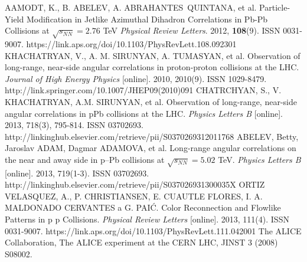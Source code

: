 \documentclass[thesismargins, thesislinespacing]{rnthesis}
\begin{document}
\begin{thebibliography}{}
AAMODT, K., B. ABELEV, A. ABRAHANTES QUINTANA, et al. Particle-Yield Modification in Jetlike Azimuthal Dihadron Correlations in Pb-Pb Collisions at $\sqrt{s_{NN}} = 2.76$ TeV \textit{Physical Review Letters}. 2012, \textbf{108}(9). ISSN 0031-9007. https://link.aps.org/doi/10.1103/PhysRevLett.108.092301
KHACHATRYAN, V., A. M. SIRUNYAN, A. TUMASYAN, et al. Observation of long-range, near-side angular correlations in proton-proton collisions at the LHC. \textit{Journal of High Energy Physics} [online]. 2010, 2010(9). ISSN 1029-8479. http://link.springer.com/10.1007/JHEP09(2010)091
CHATRCHYAN, S., V. KHACHATRYAN, A.M. SIRUNYAN, et al. Observation of long-range, near-side angular correlations in pPb collisions at the LHC. \textit{Physics Letters B} [online]. 2013, 718(3), 795-814. ISSN 03702693. http://linkinghub.elsevier.com/retrieve/pii/S0370269312011768
ABELEV, Betty, Jaroslav ADAM, Dagmar ADAMOVA, et al. Long-range angular correlations on the near and away side in p–Pb collisions at $\sqrt{s_{NN}}=5.02$ TeV. \textit{Physics Letters B} [online]. 2013, 719(1-3). ISSN 03702693. http://linkinghub.elsevier.com/retrieve/pii/S037026931300035X
ORTIZ VELASQUEZ, A., P. CHRISTIANSEN, E. CUAUTLE FLORES, I. A. MALDONADO CERVANTES a G. PAIĆ. Color Reconnection and Flowlike Patterns in p p Collisions. \textit{Physical Review Letters} [online]. 2013, 111(4). ISSN 0031-9007. https://link.aps.org/doi/10.1103/PhysRevLett.111.042001
The ALICE Collaboration, The ALICE experiment at the CERN LHC, JINST 3 (2008) S08002.


\end{thebibliography}
\end{document}
